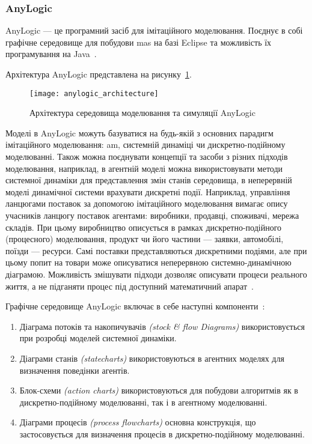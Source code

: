 \subsubsection{AnyLogic}
AnyLogic --- це програмний засіб для імітаційного моделювання. 
Поєднує в собі графічне середовище для побудови \acrshort{mas} на базі Eclipse та можливість їх програмування на Java~\cite{anylogic,Kravari2015}.

Архітектура AnyLogic представлена на рисунку~\ref{fig:anylogic_architecture}.

\begin{figure}[H]
	\centering
	\texttt{[image: anylogic\_architecture]}
	\caption{Архітектура середовища моделювання та симуляції AnyLogic~\cite{Borshchev2002}}
	\label{fig:anylogic_architecture}
\end{figure}

Моделі в AnyLogic можуть базуватися на будь-якій з основних парадигм імітаційного моделювання: \acrshort{am}, системній динаміці чи дискретно-подійному моделюванні. 
Також можна поєднувати концепції та засоби з різних підходів моделювання, наприклад, в агентній моделі можна використовувати методи системної динаміки для представлення змін станів середовища, в неперервній моделі динамічної системи врахувати дискретні події.
Наприклад, управління ланцюгами поставок за допомогою імітаційного моделювання вимагає опису учасників ланцюгу поставок агентами: виробники, продавці, споживачі, мережа складів. 
При цьому виробництво описується в рамках дискретно-подійного (процесного) моделювання, продукт чи його частини --- заявки, автомобілі, поїзди --- ресурси. 
Самі поставки представляються дискретними подіями, але при цьому попит на товари може описуватися неперервною системно-динамічною діаграмою. 
Можливість змішувати підходи дозволяє описувати процеси реального життя, а не підганяти процес під доступний математичний апарат~\cite{anylogic,Kravari2015}.

Графічне середовище AnyLogic включає в себе наступні компоненти~\cite{anylogic}:
\begin{enumerate}
	\item Діаграма потоків та накопичувачів \textit{(stock \& flow Diagrams)} використовується при розробці моделей системної динаміки.
	\item Діаграми станів \textit{(statecharts)} використовуються в агентних моделях для визначення поведінки агентів.
	\item Блок-схеми \textit{(action charts)} використовуються для побудови алгоритмів як в дискретно-подійному моделюванні, так і в агентному моделюванні.
	\item Діаграми процесів \textit{(process flowcharts)} основна конструкція, що застосовується для визначення процесів в дискретно-подійному моделюванні.
\end{enumerate}


